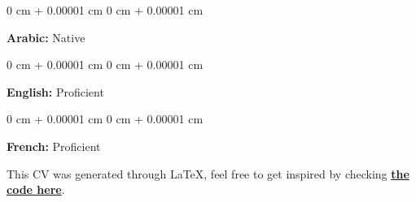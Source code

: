\documentclass[10pt, letterpaper]{article}
\newenvironment{onecolentry}{ \begin{adjustwidth}{ 0 cm + 0.00001 cm }{ 0 cm + 0.00001 cm }
}{ \end{adjustwidth} } %
\begin{document}
\begin{onecolentry}
	\textbf{Arabic:} Native
\end{onecolentry}

\vspace{0.2 cm}

\begin{onecolentry}
	\textbf{English:} Proficient
\end{onecolentry}

\vspace{0.2 cm}
\begin{onecolentry}
	\textbf{French:} Proficient
\end{onecolentry}

\vspace*{\fill}

{\small This CV was generated through LaTeX, feel free to get inspired by checking {\href{https://github.com/wadhah101/mycv/}{\textbf{the code here}}}.}
\end{document}
